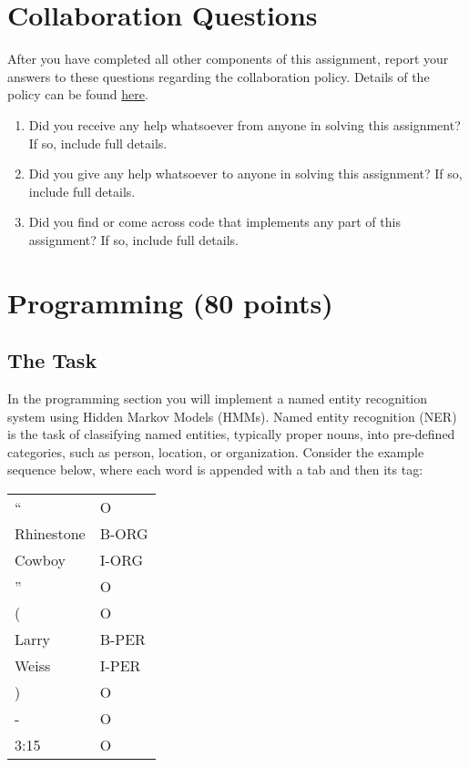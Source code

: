 \documentclass[11pt,addpoints,answers]{exam}
\begin{document}
\section{Collaboration Questions}
After you have completed all other components of this assignment, report your answers to these questions regarding the collaboration policy. Details of the policy can be found \href{http://www.cs.cmu.edu/~mgormley/courses/10601/syllabus.html}{here}.
\begin{enumerate}
    \item Did you receive any help whatsoever from anyone in solving this assignment? If so, include full details.
    \item Did you give any help whatsoever to anyone in solving this assignment? If so, include full details.
    \item Did you find or come across code that implements any part of this assignment? If so, include full details.
\end{enumerate}

\begin{your_solution}[height=6cm]

\end{your_solution}

\newpage
\section{Programming (80 points)}
\label{programming}

\subsection{The Task}\label{task}
In the programming section you will implement a named entity recognition system using Hidden Markov Models (HMMs). Named entity recognition (NER) is the task of classifying named entities, typically proper nouns,  into pre-defined categories, such as person, location, or organization. Consider the example sequence below, where each word is appended with a tab and then its tag:

\begin{tabular}{ m{3cm}  m{3cm} } 
    `` & O \\
    Rhinestone & B-ORG \\
    Cowboy & I-ORG \\
    '' & O \\
    ( & O \\
    Larry & B-PER \\
    Weiss & I-PER \\
    ) & O \\ 
    - & O \\
    3:15 & O
\end{tabular}
\end{document}
